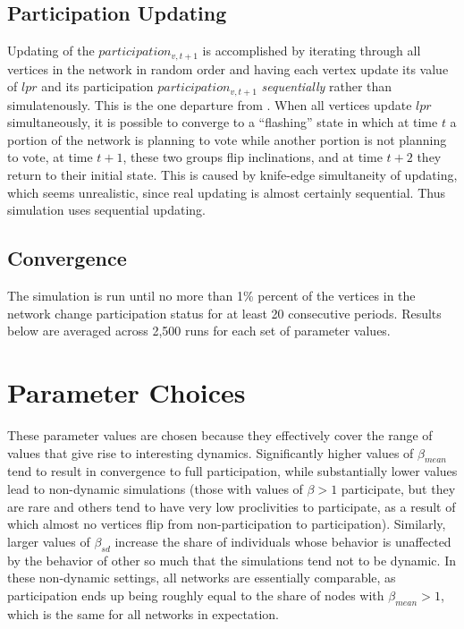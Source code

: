 \documentclass[12pt]{article}
\begin{document}
\begin{appendix}
\subsection{Participation Updating}

Updating of the $participation_{v, t+1}$ is accomplished by iterating through all vertices in the network in random order and having each vertex update its value of $lpr$ and its participation $participation_{v, t+1}$ \emph{sequentially} rather than simulatenously. This is the one departure from \cite{Siegel:2009vi}. When all vertices update $lpr$ simultaneously, it is possible to converge to a ``flashing'' state in which at time $t$ a portion of the network is planning to vote while another portion is not planning to vote, at time $t+1$, these two groups flip inclinations, and at time $t+2$ they return to their initial state. This is caused by knife-edge simultaneity of updating, which seems unrealistic, since real updating is almost certainly sequential.  Thus simulation uses sequential updating.

\subsection{Convergence}

The simulation is run until no more than 1\% percent of the vertices in the network change participation status for at least 20 consecutive periods. Results below are averaged across 2,500 runs for each set of parameter values.


\section{Parameter Choices}\label{appendix_parameter_choices}

These parameter values are chosen because they effectively cover the range of values that give rise to interesting dynamics. Significantly higher values of $\beta_{mean}$ tend to result in convergence to full participation, while substantially lower values lead to non-dynamic simulations (those with values of $ \beta > 1$ participate, but they are rare and others tend to have very low proclivities to participate, as a result of which almost no vertices flip from non-participation to participation). Similarly, larger values of $\beta_{sd}$ increase the share of individuals whose behavior is unaffected by the behavior of other so much that the simulations tend not to be dynamic. In these non-dynamic settings, all networks are essentially comparable, as participation ends up being roughly equal to the share of nodes with $\beta_{mean} > 1$, which is the same for all networks in expectation.


\end{appendix}
\end{document}
